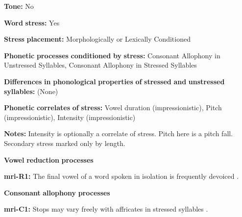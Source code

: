 \begin{styleBody}
\textbf{Tone:} No
\end{styleBody}

\begin{styleBody}
\textbf{Word} \textbf{stress:} Yes
\end{styleBody}

\begin{styleBody}
\textbf{Stress} \textbf{placement:} Morphologically or Lexically Conditioned
\end{styleBody}

\begin{styleBody}
\textbf{Phonetic} \textbf{processes} \textbf{conditioned} \textbf{by} \textbf{stress:} Consonant Allophony in Unstressed Syllables, Consonant Allophony in Stressed Syllables
\end{styleBody}

\begin{styleBody}
\textbf{Differences} \textbf{in} \textbf{phonological} \textbf{properties} \textbf{of} \textbf{stressed} \textbf{and} \textbf{unstressed} \textbf{syllables:} (None)
\end{styleBody}

\begin{styleBody}
\textbf{Phonetic} \textbf{correlates} \textbf{of} \textbf{stress:} Vowel duration (impressionistic), Pitch (impressionistic), Intensity (impressionistic)
\end{styleBody}

\begin{styleBody}
\textbf{Notes:} Intensity is optionally a correlate of stress. Pitch here is a pitch fall. Secondary stress marked only by length.
\end{styleBody}

\begin{styleBody}
\textbf{Vowel} \textbf{reduction} \textbf{processes}
\end{styleBody}

\begin{styleBody}
\textbf{mri-R1:} The final vowel of a word spoken in isolation is frequently devoiced \citep[546]{Bauer1999}.
\end{styleBody}

\begin{styleBody}
\textbf{Consonant} \textbf{allophony} \textbf{processes}
\end{styleBody}

\begin{styleBody}
\textbf{mri-C1:} Stops may vary freely with affricates in stressed syllables \citep[545]{Bauer1999}.
\end{styleBody}


